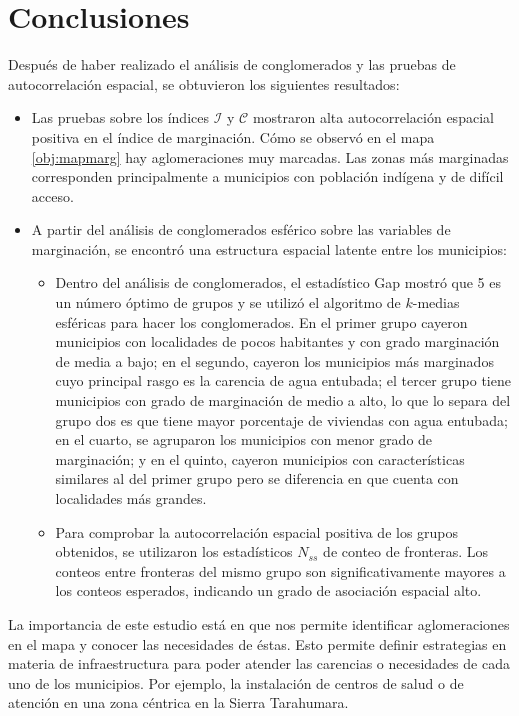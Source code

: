\chapter{Conclusiones}
Después de haber realizado el análisis de conglomerados y las pruebas de autocorrelación espacial, se obtuvieron los siguientes resultados:

\begin{itemize}

\item Las pruebas sobre los índices $\mathcal{I}$ y $\mathcal{C}$ mostraron alta autocorrelación espacial positiva en el índice de marginación. Cómo se observó en el mapa \ref{obj:mapmarg} hay aglomeraciones muy marcadas. Las zonas más marginadas corresponden principalmente a municipios con población indígena y de difícil acceso.

\item A partir del análisis de conglomerados esférico sobre las variables de marginación, se encontró una estructura espacial latente entre los municipios:

\begin{itemize}
\item Dentro del análisis de conglomerados, el estadístico Gap mostró que 5 es un número óptimo de grupos y se utilizó el algoritmo de $k$-medias esféricas para hacer los conglomerados. En el primer grupo cayeron municipios con localidades de pocos habitantes y con grado marginación de media a bajo; en el segundo, cayeron los municipios más marginados cuyo principal rasgo es la carencia de agua entubada; el tercer grupo tiene municipios con grado de marginación de medio a alto, lo que lo separa del grupo dos es que tiene mayor porcentaje de viviendas con agua entubada; en el cuarto, se agruparon los municipios con menor grado de marginación; y en el quinto, cayeron municipios con características similares al del primer grupo pero se diferencia en que cuenta con localidades más grandes.

\item Para comprobar la autocorrelación espacial positiva de los grupos obtenidos, se utilizaron los estadísticos $N_{ss}$ de conteo de fronteras. Los conteos entre fronteras del mismo grupo son significativamente mayores a los conteos esperados, indicando un grado de asociación espacial alto.
\end{itemize}
\end{itemize}

La importancia de este estudio está en que nos permite identificar aglomeraciones en el mapa y conocer las necesidades de éstas. Esto permite definir estrategias en materia de infraestructura para poder atender las carencias o necesidades de cada uno de los municipios. Por ejemplo, la instalación de centros de salud o de atención en una zona céntrica en la Sierra Tarahumara. 

